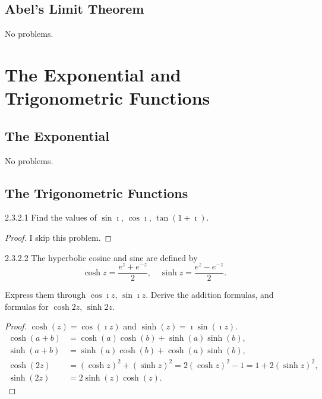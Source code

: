 \subsection{Abel's Limit Theorem}

No problems.

\section{The Exponential and Trigonometric Functions}

\subsection{The Exponential}

No problems.

\subsection{The Trigonometric Functions}

\begin{problem}{2.3.2.1}
Find the values of \( \sin \imath \), \( \cos \imath \), \( \tan(1+\imath) \).
\end{problem}

\begin{proof}
	I skip this problem.
\end{proof}

\begin{problem}{2.3.2.2}
The hyperbolic cosine and sine are defined by
\[
	\cosh z = \frac{e^{z} + e^{-z}}{2}, \quad \sinh z = \frac{e^{z} - e^{-z}}{2}.
\]

Express them through \( \cos \imath z \), \( \sin \imath z \). Derive the addition formulas, and formulas for \( \cosh 2z \), \( \sinh 2z \).
\end{problem}

\begin{proof}
	\( \cosh(z) = \cos(\imath z) \) and \( \sinh(z) = \imath \sin(\imath z) \).
	\begingroup
	\allowdisplaybreaks%
	\begin{align*}
		\cosh(a + b) & = \cosh(a)\cosh(b) + \sinh(a)\sinh(b),                                              \\
		\sinh(a + b) & = \sinh(a)\cosh(b) + \cosh(a)\sinh(b),                                              \\
		\cosh(2z)    & = {(\cosh z)}^{2} + {(\sinh z)}^{2} = 2{(\cosh z)}^{2} - 1 = 1 + 2 {(\sinh z)}^{2}, \\
		\sinh(2z)    & = 2\sinh(z) \cosh(z).
	\end{align*}
	\endgroup
\end{proof}

